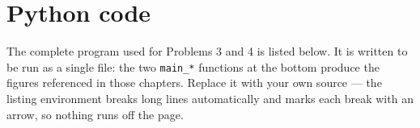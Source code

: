 %
%

\section*{Python code}
{}

The complete program used for Problems 3 and 4 is listed below. It is written
to be run as a single file: the two \texttt{main\_*} functions at the bottom
produce the figures referenced in those chapters. Replace it with your own
source — the listing environment breaks long lines automatically and marks each
break with an arrow, so nothing runs off the page.

